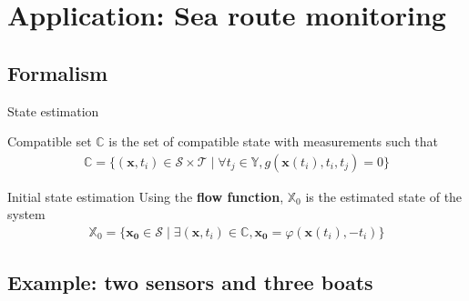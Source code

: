\documentclass{beamer}
\begin{document}
    \section{Application: Sea route monitoring}

        \subsection{Formalism}
            
            \begin{frame}{State estimation}
                \begin{block}{Compatible set}
                    $\mathbb{C}$ is the set of compatible state with measurements such that
                    \begin{eqnarray}
                        \mathbb{C} = \{ (\mathbf{x}, t_i) \in \mathcal{S} \times \mathcal{T} \mid \forall t_j \in \mathbb{Y}, g(\mathbf{x}(t_i), t_i, t_j) = 0\}
                    \end{eqnarray}
                \end{block}

                \begin{block}{Initial state estimation}
                    Using the \textbf{flow function}, $\mathbb{X}_0$ is the estimated state of the system
                    \begin{eqnarray}
                        \mathbb{X}_0 = \{ \mathbf{x_0} \in \mathcal{S} \mid \exists (\mathbf{x}, t_i) \in \mathbb{C}, \mathbf{x_0} = \varphi(\mathbf{x}(t_i), -t_i) \}
                    \end{eqnarray}
                \end{block}
            \end{frame}

        \subsection{Example: two sensors and three boats}
\end{document}
